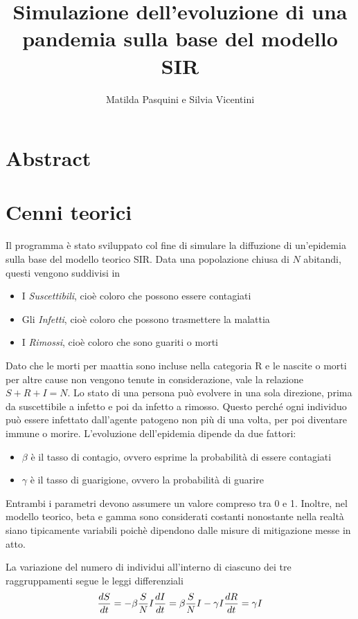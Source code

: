 \documentclass[12pt, a4paper]{article} %
\title{Simulazione dell'evoluzione di una pandemia sulla base del modello SIR}
\author{Matilda Pasquini e Silvia Vicentini}
\begin{document}
\maketitle
\section{Abstract}

\section{Cenni teorici}
Il programma \`{e} stato sviluppato col fine di simulare la diffuzione di un'epidemia sulla base del modello teorico SIR. Data una popolazione chiusa di $N$ abitandi, questi vengono suddivisi in
\begin{itemize}
\item I \textit{Suscettibili}, cio\`{e} coloro che possono essere contagiati
\item Gli \textit{Infetti}, cio\`{e} coloro che possono trasmettere la malattia
\item I \textit{Rimossi}, cio\`{e} coloro che sono guariti o morti
\end{itemize}
Dato che le morti per maattia sono incluse nella categoria R e le nascite o morti per altre cause non vengono tenute in considerazione, vale la relazione $S+R+I=N$. Lo stato di una persona pu\`{o} evolvere in una sola direzione, prima da suscettibile a infetto e poi da infetto a rimosso. Questo perch\'e ogni individuo pu\`{o} essere infettato dall'agente patogeno non pi\`{u} di una volta, per poi diventare immune o morire. 
L'evoluzione dell'epidemia dipende da due fattori:
\begin{itemize}
\item \textit{$\beta$} \`{e} il tasso di contagio, ovvero esprime la probabilit\`{a} di essere contagiati

\item \textit{$\gamma$} \`{e} il tasso di guarigione, ovvero la probabilit\`{a} di guarire
\end{itemize}

Entrambi i parametri devono assumere un valore compreso tra 0 e 1. Inoltre, nel modello teorico, beta e gamma sono considerati costanti nonostante nella realtà siano tipicamente variabili poichè dipendono dalle misure di mitigazione messe in atto.

La variazione del numero di individui all'interno di ciascuno dei tre raggruppamenti segue le leggi differenziali
\begin{equation}
\frac{dS}{dt} = -\beta \frac{S}{N}I \\
\frac{dI}{dt} = \beta \frac{S}{N}I-\gamma I  \\ %
\frac{dR}{dt} = \gamma I \\
\end{equation}
\end{document}
